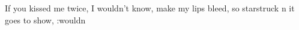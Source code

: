 If you kissed me twice, I wouldn't know,
make my lips bleed,
so starstruck n it goes to show,
:wouldn
